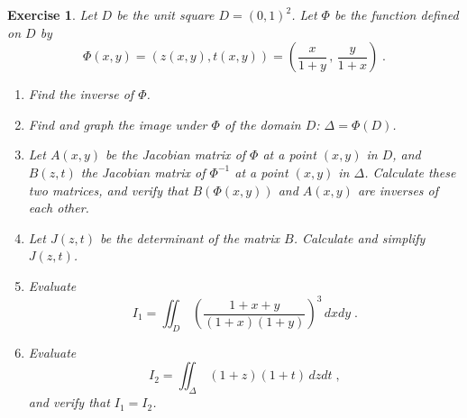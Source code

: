 \documentclass{article}
\newtheorem{exo}{Exercise}[section]
\begin{document}
\begin{exo}{\rm
Let $D$ be the unit square $D=(0,1)^2$. Let $\Phi$
be the function defined on $D$ by
\[
\Phi(x,y) = (z(x,y),t(x,y))=
\left(\frac{x}{1+y}\,,\,\frac{y}{1+x}\right)\;.
\]
\begin{enumerate}
\item
Find the inverse of $\Phi$.
\item
Find and graph the image under $\Phi$ of the domain $D$: $\Delta=\Phi(D)$.
\item
Let $A(x,y)$ be the Jacobian matrix of $\Phi$ at a point $(x,y)$ in
$D$, and $B(z,t)$ the Jacobian matrix of $\Phi^{-1}$ at a point
$(x,y)$ in $\Delta$. Calculate these two matrices, and verify that 
$B(\Phi(x,y))$ and $A(x,y)$ are inverses of each other.
\item
Let $J(z,t)$ be the determinant of the matrix $B$. Calculate and simplify 
$J(z,t)$.
\item
Evaluate
\[
I_1=\iint_D\,\left( \frac{1+x+y}{(1+x)(1+y)} \right)^3 \,dxdy\;.
\]  
\item
Evaluate
\[
I_2=\iint_\Delta\,(1+z)(1+t)\,dzdt\;,
\]  
and verify that $I_1=I_2$.
\end{enumerate}
}\end{exo}

\newpage

\printindex
\end{document}
